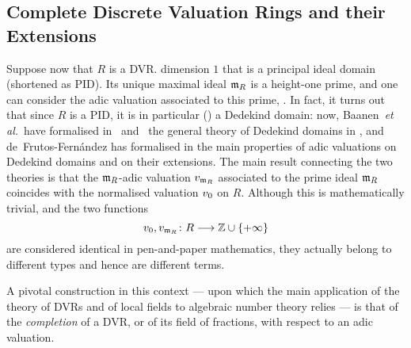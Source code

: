 \documentclass[sigplan,10pt,anonymous,review]{acmart}
\begin{document}
\subsection{Complete Discrete Valuation Rings and their Extensions}\label{subsec:complete_DVR}
Suppose now that $R$ is a DVR.  dimension $1$ that is a principal ideal domain (shortened as PID). Its unique maximal ideal $\mathfrak{m}_{R}$ is a height-one prime, and one can consider the adic valuation associated to this prime, . In fact, it turns out that since $R$ is a PID, it is in particular () a Dedekind domain: now, Baanen~\emph{et al.}~have formalised in~\cite{BaaDahNarNuc21} and~\cite{BaaDahNarNuc22} the general theory of Dedekind domains in \lean, and de~Frutos-Fernández  has formalised in \lean the main properties of adic valuations on Dedekind domains and on their extensions. The main result connecting the two theories is that the $\mathfrak{m}_{R}$-adic valuation $v_{\mathfrak{m}_{R}}$ associated to the prime ideal $\mathfrak{m}_{R}$ coincides with the normalised valuation ${v}_{0}$ on $R$. Although this is mathematically trivial, and the two functions
\[
{v}_{0},v_{\mathfrak{m}_{R}}\colon R\longrightarrow \mathbb{Z}\cup\{+\infty\}
\]
are considered identical in pen-and-paper mathematics, they actually belong to different types and hence are different terms.  


\vspace{3cm}

A pivotal construction in this context --- upon which the main application of the theory of DVRs and of local fields to algebraic number theory relies --- is that of the \emph{completion} of a DVR, or of its field of fractions, with respect to an adic valuation.
\end{document}
